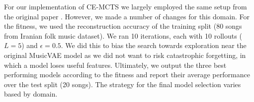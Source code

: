 \documentclass[letterpaper]{article}
\begin{document}

For our implementation of CE-MCTS we largely employed the same setup from the original paper \cite{Mahajan2023}. 
However, we made a number of changes for this domain.
For the fitness, we used the reconstruction accuracy of the training split (80 songs from Iranian folk music dataset).
We ran 10 iterations, each with 10 rollouts ($L=5$) and $\epsilon=0.5$.
We did this to bias the search towards exploration near the original MusicVAE model as we did not want to risk catastrophic forgetting, in which a model loses useful features.
Ultimately, we output the three best performing models according to the fitness and report their average performance over the test split (20 songs). 
The strategy for the final model selection varies based by domain.


\end{document}
